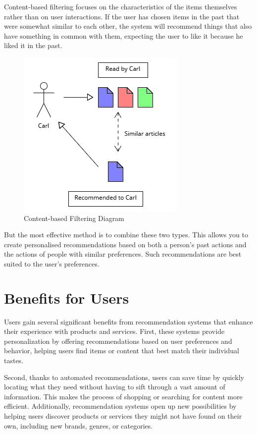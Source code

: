 \documentclass[10pt,twoside,slovak,a4paper]{article}
\begin{document}
\begin{enumerate}
Content-based filtering focuses on the characteristics of the items themselves rather than on user interactions. If the user has chosen items in the past that were somewhat similar to each other, the system will recommend things that also have something in common with them, expecting the user to like it because he liked it in the past.
\begin{figure}[!h]
    \centering
    \includegraphics[width=0.7\linewidth]{Diagram 4.png}
    \caption{Content-based Filtering Diagram}
    \label{fig:content-based}
\end{figure}
	
\end{enumerate}

But the most effective method is to combine these two types. This allows you to create personalised recommendations based on both a person's past actions and the actions of people with similar preferences. Such recommendations are best suited to the user's preferences.


\section{Benefits for Users} \label{Benefits for Users}
Users gain several significant benefits from recommendation systems that enhance their experience with products and services. First, these systems provide personalization by offering recommendations based on user preferences and behavior, helping users find items or content that best match their individual tastes.

Second, thanks to automated recommendations, users can save time by quickly locating what they need without having to sift through a vast amount of information. This makes the process of shopping or searching for content more efficient. Additionally, recommendation systems open up new possibilities by helping users discover products or services they might not have found on their own, including new brands, genres, or categories.
\end{document}
